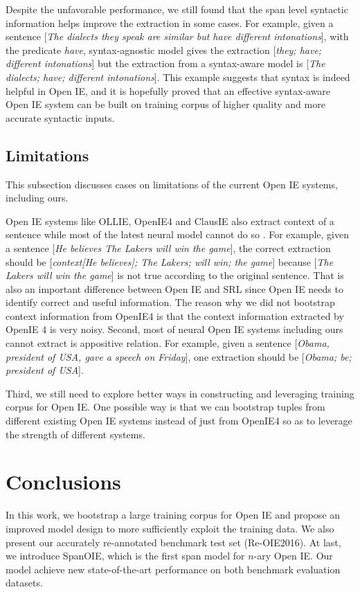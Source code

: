 \documentclass[letterpaper]{article} %
\begin{document}
Despite the unfavorable performance, we still found that the span level syntactic information helps improve the extraction in some cases. For example, given a sentence [\emph{The dialects they speak are similar but have different intonations}], with the predicate \emph{have}, syntax-agnostic model gives the extraction [\emph{they; have; different intonations}] but the extraction from a syntax-aware model is [\emph{The dialects; have; different intonations}]. This example suggests that syntax is indeed helpful in Open IE, and it is hopefully proved that an effective syntax-aware Open IE system can be built on training corpus of higher quality and more accurate syntactic inputs.

\subsection{Limitations}
This subsection discusses cases on limitations of the current Open IE systems, including ours.

Open IE systems like OLLIE, OpenIE4 and ClausIE also extract context of a sentence while most of the latest neural model cannot do so
. For example, given a sentence [\emph{He believes The Lakers will win the game}], the correct extraction should be [\emph{context[He believes]; The Lakers; will win; the game}] because [\emph{The Lakers will win the game}] is not true according to the original sentence. That is also an important difference between Open IE and SRL since Open IE needs to identify correct and useful information. The reason why we did not bootstrap context information from OpenIE4 is that the context information extracted by OpenIE 4 is very noisy. Second, most of neural Open IE systems including ours cannot extract is appositive relation. For example, given a sentence [\emph{Obama, president of USA, gave a speech on Friday}], one extraction should be [\emph{Obama; be; president of USA}].

Third, we still need to explore better ways in constructing and leveraging training corpus for Open IE. One possible way is that we can bootstrap tuples from different existing Open IE systems instead of just from OpenIE4 so as to leverage the strength of different systems.

\section{Conclusions}
In this work, we bootstrap a large training corpus for Open IE and propose an improved model design to more sufficiently exploit the training data. We also present our accurately re-annotated benchmark test set (Re-OIE2016). At last, we introduce SpanOIE, which is the first span model for $n$-ary Open IE. Our model achieve new state-of-the-art performance on both benchmark evaluation datasets.
\end{document}
